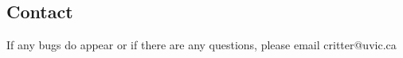 \subsection{Contact}
If any bugs do appear or if there are any questions, please email critter@uvic.ca
\begin{verbatim}

\end{verbatim}


%
%
%
%



